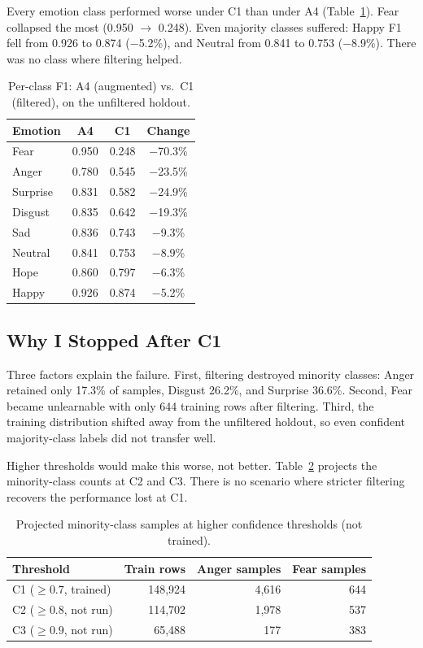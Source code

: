 \documentclass[11pt,a4paper]{article}
\begin{document}
Every emotion class performed worse under C1 than under A4 (Table~\ref{tab:per_class_c1}). Fear collapsed the most (0.950 $\rightarrow$ 0.248). Even majority classes suffered: Happy F1 fell from 0.926 to 0.874 ($-$5.2\%), and Neutral from 0.841 to 0.753 ($-$8.9\%). There was no class where filtering helped.

\begin{table}[H]
\centering
\caption{Per-class F1: A4 (augmented) vs.\ C1 (filtered), on the unfiltered holdout.}
\label{tab:per_class_c1}
\begin{tabular}{@{}lccc@{}}
\toprule
Emotion & A4 & C1 & Change \\
\midrule
Fear     & 0.950 & 0.248 & $-$70.3\% \\
Anger    & 0.780 & 0.545 & $-$23.5\% \\
Surprise & 0.831 & 0.582 & $-$24.9\% \\
Disgust  & 0.835 & 0.642 & $-$19.3\% \\
Sad      & 0.836 & 0.743 & $-$9.3\% \\
Neutral  & 0.841 & 0.753 & $-$8.9\% \\
Hope     & 0.860 & 0.797 & $-$6.3\% \\
Happy    & 0.926 & 0.874 & $-$5.2\% \\
\bottomrule
\end{tabular}
\end{table}

\subsection{Why I Stopped After C1}

Three factors explain the failure. First, filtering destroyed minority classes: Anger retained only 17.3\% of samples, Disgust 26.2\%, and Surprise 36.6\%. Second, Fear became unlearnable with only 644 training rows after filtering. Third, the training distribution shifted away from the unfiltered holdout, so even confident majority-class labels did not transfer well.

Higher thresholds would make this worse, not better. Table~\ref{tab:c2c3_projection} projects the minority-class counts at C2 and C3. There is no scenario where stricter filtering recovers the performance lost at C1.

\begin{table}[H]
\centering
\caption{Projected minority-class samples at higher confidence thresholds (not trained).}
\label{tab:c2c3_projection}
\begin{tabular}{@{}lrrr@{}}
\toprule
Threshold & Train rows & Anger samples & Fear samples \\
\midrule
C1 ($\geq 0.7$, trained) & 148,924 & 4,616 & 644 \\
C2 ($\geq 0.8$, not run) & 114,702 & 1,978 & 537 \\
C3 ($\geq 0.9$, not run) &  65,488 &   177 & 383 \\
\bottomrule
\end{tabular}
\end{table}
\end{document}
